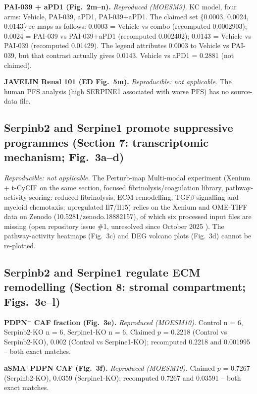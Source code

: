 \documentclass[preprint,12pt]{elsarticle}
\begin{document}
\textbf{PAI-039 + aPD1 (Fig.~2m--n).} \emph{Reproduced (MOESM9).}
KC model, four arms: Vehicle, PAI-039, aPD1, PAI-039+aPD1. The
claimed set \{0.0003, 0.0024, 0.0143\} re-maps as follows:
0.0003 = Vehicle vs combo (recomputed 0.0002903); 0.0024 =
PAI-039 vs PAI-039$+$aPD1 (recomputed 0.002402); 0.0143 = Vehicle
vs PAI-039 (recomputed 0.01429). The legend attributes 0.0003 to
Vehicle vs PAI-039, but that contrast actually gives 0.0143.
Vehicle vs aPD1 = 0.2881 (not claimed).

\textbf{JAVELIN Renal 101 (ED Fig.~5m).} \emph{Reproducible: not
applicable.} The human PFS analysis (high SERPINE1 associated with
worse PFS) has no source-data file.

\subsection{Serpinb2 and Serpine1 promote suppressive programmes
(Section 7: transcriptomic mechanism; Fig.~3a--d)}

\emph{Reproducible: not applicable.} The Perturb-map Multi-modal
experiment (Xenium + t-CyCIF on the same section, focused
fibrinolysis/coagulation library, pathway-activity scoring:
reduced fibrinolysis, ECM remodelling, TGF$\beta$ signalling and
myeloid chemotaxis; upregulated Il7/Il15) relies on the Xenium
and OME-TIFF data on Zenodo (10.5281/zenodo.18882157), of which six
processed input files are missing (open repository issue \#1,
unresolved since October 2025 \cite{repo}). The pathway-activity
heatmaps (Fig.~3c) and DEG volcano plots (Fig.~3d) cannot be
re-plotted.

\subsection{Serpinb2 and Serpine1 regulate ECM remodelling
(Section 8: stromal compartment; Figs.~3e--l)}

\textbf{PDPN$^{+}$ CAF fraction (Fig.~3e).} \emph{Reproduced
(MOESM10).} Control n = 6, Serpinb2-KO n = 6, Serpine1-KO n = 6.
Claimed $p$ = 0.2218 (Control vs Serpinb2-KO), 0.002 (Control vs
Serpine1-KO); recomputed 0.2218 and 0.001995 -- both exact
matches.

\textbf{aSMA$^{+}$PDPN CAF (Fig.~3f).} \emph{Reproduced
(MOESM10).} Claimed $p$ = 0.7267 (Serpinb2-KO), 0.0359
(Serpine1-KO); recomputed 0.7267 and 0.03591 -- both exact
matches.
\end{document}
